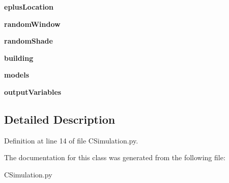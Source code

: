 \begin{DoxyCompactItemize}
{\bfseries eplus\+Location}
\item 
\mbox{\label{class_c_simulation_1_1_simulation_adb401b85e265f19065d7e0f5eb9df8b1}} 
{\bfseries random\+Window}
\item 
\mbox{\label{class_c_simulation_1_1_simulation_a441609168fcb8cdeb7f1690f37227122}} 
{\bfseries random\+Shade}
\item 
\mbox{\label{class_c_simulation_1_1_simulation_ad8fc4ed8e703f50d05f79f3b5826f620}} 
{\bfseries building}
\item 
\mbox{\label{class_c_simulation_1_1_simulation_a1d02a4626fe6eb02fa8d3f8140966774}} 
{\bfseries models}
\item 
\mbox{\label{class_c_simulation_1_1_simulation_ab75cf2328fc3c5ea1b0a21d0e1bedb20}} 
{\bfseries output\+Variables}
\end{DoxyCompactItemize}


\subsection{Detailed Description}


Definition at line 14 of file C\+Simulation.\+py.



The documentation for this class was generated from the following file\+:\begin{DoxyCompactItemize}
\item 
C\+Simulation.\+py\end{DoxyCompactItemize}
